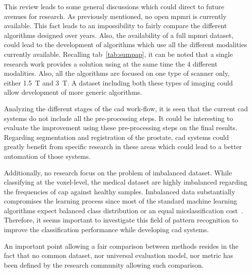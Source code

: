 This review leads to some general discussions which could direct to future avenues for research.
As previously mentioned, no open \ac{mpmri} is currently available.
This fact leads to an impossibility to fairly compare the different algorithms designed over years.
Also, the availability of a full \ac{mpmri} dataset, could lead to the development of algorithms which use all the different modalities currently available.
Recalling \acs{tab}~\ref{tab:sumpap}, it can be noted that a single research work provides a solution using at the same time the 4 different modalities.
Also, all the algorithms are focused on one type of scanner only, either \SI{1.5}{\tesla} and \SI{3}{\tesla}.
A dataset including both these types of imaging could allow development of more generic algorithms.

Analyzing the different stages of the \ac{cad} work-flow, it is seen that the current \ac{cad} systems do not include all the pre-processing steps.
It could be interesting to evaluate the improvement using these pre-processing steps on the final results.
Regarding segmentation and registration of the prostate, \ac{cad} systems could greatly benefit from specific research in these areas which could lead to a better automation of those systems.


Additionally, no research focus on the problem of imbalanced dataset.
While classifying at the voxel-level, the medical dataset are highly imbalanced regarding the frequencies of \ac{cap} against healthy samples.
Imbalanced data substantially compromises the learning process since most of the standard machine learning algorithms expect balanced class distribution or an equal micslassification cost~\cite{he2009learning}.
Therefore, it seems important to investigate this field of pattern recognition to improve the classification performance while developing \ac{cad} systems.

An important point allowing a fair comparison between methods resides in the fact that no common dataset, nor universal evaluation model, nor metric has been defined by the research community allowing such comparison.


